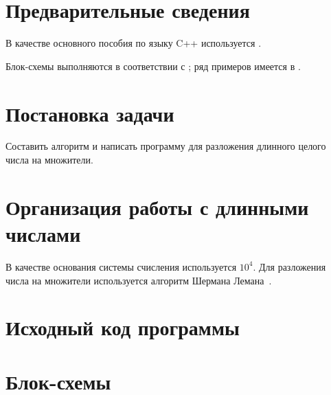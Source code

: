 \documentclass[a4paper,12pt]{article} %
\begin{document}
\setcounter{page}{2}

\section*{Предварительные сведения}

В качестве основного пособия по языку C++ используется \cite{chmyhalo}.


Блок-схемы выполняются в соответствии с \cite{gost-block-scheme};
ряд примеров имеется в \cite{wiki-block-scheme}.


\section*{Постановка задачи}
Составить алгоритм и написать программу
для разложения длинного целого числа на множители.

\section*{Организация работы с длинными числами}
В качестве основания системы счисления используется $10^4$.
Для разложения числа на множители используется алгоритм Шермана Лемана~\cite{wiki-Leman}.


\section*{Исходный код программы}







\section*{Блок-схемы}
\end{document}

